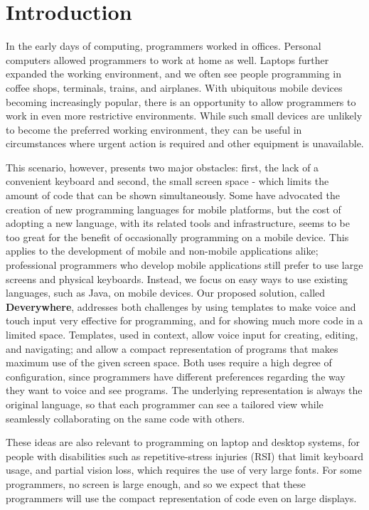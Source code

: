 \chapter{Introduction}
In the early days of computing, programmers worked in offices. Personal computers allowed programmers to work at home as well. Laptops further expanded the working environment, and we often see people programming in coffee shops, terminals, trains, and airplanes. With ubiquitous mobile devices becoming increasingly popular, there is an opportunity to allow programmers to work in even more restrictive environments. While such small devices are unlikely to become the preferred working environment, they can be useful in circumstances where urgent action is required and other equipment is unavailable.

This scenario, however, presents two major obstacles: first, the lack of a convenient keyboard and second, the small screen space - which limits the amount of code that can be shown simultaneously. Some have advocated the creation of new programming languages for mobile platforms, but the cost of adopting a new language, with its related tools and infrastructure, seems to be too great for the benefit of occasionally programming on a mobile device. This applies to the development of mobile and non-mobile applications alike; professional programmers who develop mobile applications still prefer to use large screens and physical keyboards. Instead, we focus on easy ways to use existing languages, such as Java, on mobile devices. Our proposed solution, called \textbf{Deverywhere}, addresses both challenges by using templates to make voice and touch input very effective for programming, and for showing much more code in a limited space. Templates, used in context, allow voice input for creating, editing, and navigating; and allow a compact representation of programs that makes maximum use of the given screen space. Both uses require a high degree of configuration, since programmers have different preferences regarding the way they want to voice and see programs. The underlying representation is always the original language, so that each programmer can see a tailored view while seamlessly collaborating on the same code with others.

These ideas are also relevant to programming on laptop and desktop systems, for people with disabilities such as repetitive-stress injuries (RSI) that limit keyboard usage, and partial vision loss, which requires the use of very large fonts. For some programmers, no screen is large enough, and so we expect that these programmers will use the compact representation of code even on large displays.
